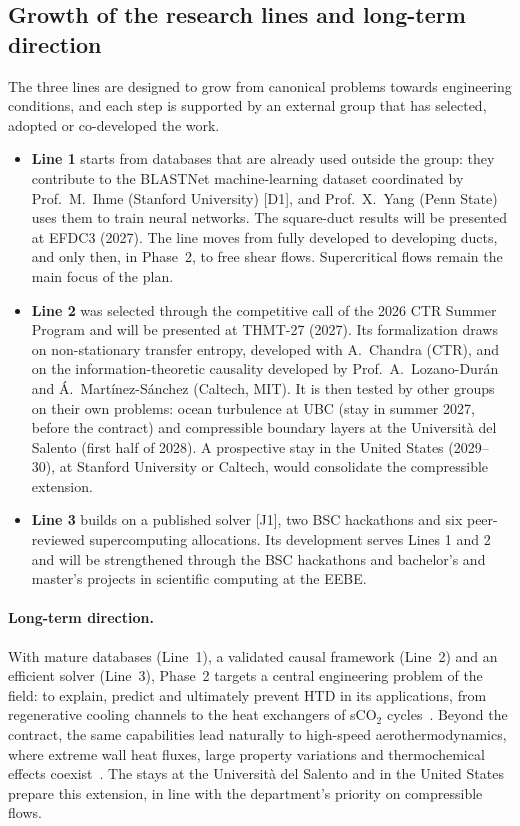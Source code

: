 \documentclass[11pt]{article}
\begin{document}
\subsection{Growth of the research lines and long-term direction}\label{sec:growth}
The three lines are designed to grow from canonical problems towards engineering conditions,
and each step is supported by an external group that has selected, adopted or co-developed
the work.
\begin{itemize}
  \item \textbf{Line 1} starts from databases that are already used outside the group: they
  contribute to the BLASTNet machine-learning dataset coordinated by Prof.\ M.\ Ihme
  (Stanford University) [D1], and Prof.\ X.\ Yang (Penn State) uses them to train neural
  networks. The square-duct results will be presented at EFDC3 (2027). The line moves from
  fully developed to developing ducts, and only then, in Phase~2, to free shear flows.
  Supercritical flows remain the main focus of the plan.
  \item \textbf{Line 2} was selected through the competitive call of the 2026 CTR Summer
  Program and will be presented at THMT-27 (2027). Its formalization draws on non-stationary
  transfer entropy, developed with A.\ Chandra (CTR), and on the information-theoretic
  causality developed by Prof.\ A.\ Lozano-Dur\'an and \'A.\ Mart\'inez-S\'anchez
  (Caltech, MIT). It is then tested by other groups on their own problems: ocean turbulence
  at UBC (stay in summer 2027, before the contract) and compressible boundary layers at the
  Universit\`a del Salento (first half of 2028). A prospective stay in the United States
  (2029--30), at Stanford University or Caltech, would consolidate the compressible
  extension.
  \item \textbf{Line 3} builds on a published solver [J1], two BSC hackathons and six
  peer-reviewed supercomputing allocations. Its development serves Lines 1 and 2 and will
  be strengthened through the BSC hackathons and bachelor's and master's projects in
  scientific computing at the EEBE.
\end{itemize}

\paragraph{Long-term direction.} With mature databases (Line~1), a validated causal framework
(Line~2) and an efficient solver (Line~3), Phase~2 targets a central engineering problem of
the field: to explain, predict and ultimately prevent HTD in its applications, from
regenerative cooling channels to the heat exchangers of sCO$_2$
cycles~\cite{Pizzarelli2018,Ahn2015}. Beyond the contract, the same capabilities lead
naturally to high-speed aerothermodynamics, where extreme wall heat fluxes, large property
variations and thermochemical effects coexist~\cite{Urzay2018,DiRenzoUrzay2021,Passiatore2022}.
The stays at the Universit\`a del Salento and in the United States prepare this extension,
in line with the department's priority on compressible flows.
\end{document}
